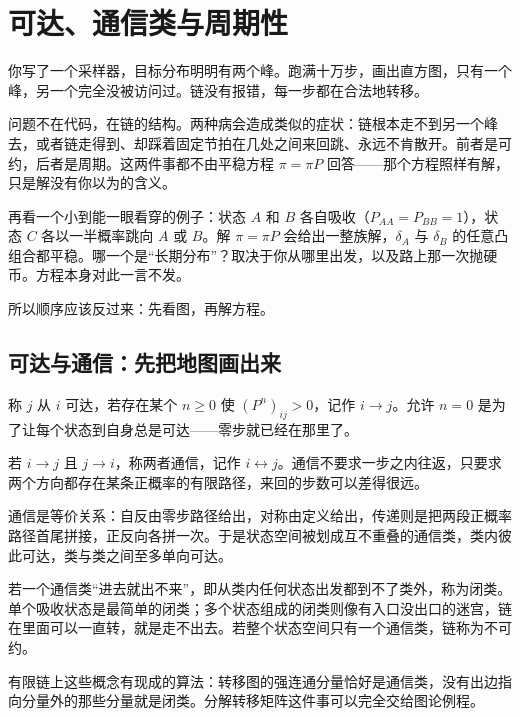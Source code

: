 \section{可达、通信类与周期性}
\label{sec:06-Random-Processes/03-Markov-Chains/02}

你写了一个采样器，目标分布明明有两个峰。跑满十万步，画出直方图，只有一个峰，另一个完全没被访问过。链没有报错，每一步都在合法地转移。

问题不在代码，在链的结构。两种病会造成类似的症状：链根本走不到另一个峰去，或者链走得到、却踩着固定节拍在几处之间来回跳、永远不肯散开。前者是可约，后者是周期。这两件事都不由平稳方程 \(\pi=\pi P\) 回答——那个方程照样有解，只是解没有你以为的含义。

再看一个小到能一眼看穿的例子：状态 \(A\) 和 \(B\) 各自吸收（\(P_{AA}=P_{BB}=1\)），状态 \(C\) 各以一半概率跳向 \(A\) 或 \(B\)。解 \(\pi=\pi P\) 会给出一整族解，\(\delta_A\) 与 \(\delta_B\) 的任意凸组合都平稳。哪一个是``长期分布''？取决于你从哪里出发，以及路上那一次抛硬币。方程本身对此一言不发。

所以顺序应该反过来：先看图，再解方程。

\subsection{可达与通信：先把地图画出来}

称 \(j\) 从 \(i\) 可达，若存在某个 \(n\ge0\) 使 \((P^n)_{ij}>0\)，记作 \(i\to j\)。允许 \(n=0\) 是为了让每个状态到自身总是可达——零步就已经在那里了。

若 \(i\to j\) 且 \(j\to i\)，称两者通信，记作 \(i\leftrightarrow j\)。通信不要求一步之内往返，只要求两个方向都存在某条正概率的有限路径，来回的步数可以差得很远。

通信是等价关系：自反由零步路径给出，对称由定义给出，传递则是把两段正概率路径首尾拼接，正反向各拼一次。于是状态空间被划成互不重叠的通信类，类内彼此可达，类与类之间至多单向可达。

若一个通信类``进去就出不来''，即从类内任何状态出发都到不了类外，称为闭类。单个吸收状态是最简单的闭类；多个状态组成的闭类则像有入口没出口的迷宫，链在里面可以一直转，就是走不出去。若整个状态空间只有一个通信类，链称为不可约。

有限链上这些概念有现成的算法：转移图的强连通分量恰好是通信类，没有出边指向分量外的那些分量就是闭类。分解转移矩阵这件事可以完全交给图论例程。


